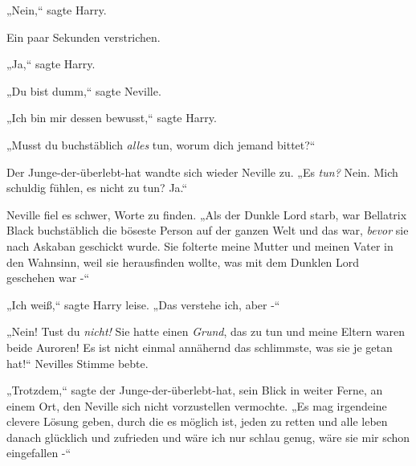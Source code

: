 „Nein,“ sagte Harry.

Ein paar Sekunden verstrichen.

„Ja,“ sagte Harry.

„Du bist dumm,“ sagte Neville.

„Ich bin mir dessen bewusst,“ sagte Harry.

„Musst du buchstäblich \emph{alles} tun, worum dich jemand bittet?“

Der Junge-der-überlebt-hat wandte sich wieder Neville zu. „Es \emph{tun?} Nein. Mich schuldig fühlen, es nicht zu tun? Ja.“

Neville fiel es schwer, Worte zu finden. „Als der Dunkle Lord starb, war Bellatrix Black buchstäblich die böseste Person auf der ganzen Welt und das war, \emph{bevor} sie nach Askaban geschickt wurde. Sie folterte meine Mutter und meinen Vater in den Wahnsinn, weil sie herausfinden wollte, was mit dem Dunklen Lord geschehen war -“

„Ich weiß,“ sagte Harry leise. „Das verstehe ich, aber -“

„Nein! Tust du \emph{nicht!} Sie hatte einen \emph{Grund}, das zu tun und meine Eltern waren beide Auroren! Es ist nicht einmal annähernd das schlimmste, was sie je getan hat!“ Nevilles Stimme bebte.

„Trotzdem,“ sagte der Junge-der-überlebt-hat, sein Blick in weiter Ferne, an einem Ort, den Neville sich nicht vorzustellen vermochte. „Es mag irgendeine clevere Lösung geben, durch die es möglich ist, jeden zu retten und alle leben danach glücklich und zufrieden und wäre ich nur schlau genug, wäre sie mir schon eingefallen -“

